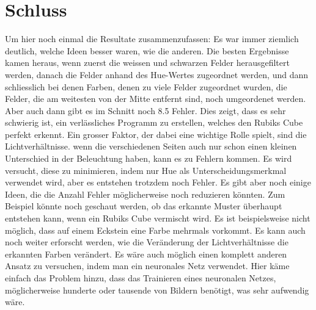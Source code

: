 \documentclass[a4paper, 12pt]{article}
\begin{document}
\section{Schluss}
Um hier noch einmal die Resultate zusammenzufassen: Es war immer ziemlich deutlich, welche Ideen besser waren, wie die anderen. Die besten Ergebnisse kamen heraus, wenn zuerst die weissen und schwarzen Felder herausgefiltert werden, danach die Felder anhand des Hue-Wertes zugeordnet werden, und dann schliesslich bei denen Farben, denen zu viele Felder zugeordnet wurden, die Felder, die am weitesten von der Mitte entfernt sind, noch umgeordenet werden. Aber auch dann gibt es im Schnitt noch 8.5 Fehler. Dies zeigt, dass es sehr schwierig ist, ein verlässliches Programm zu erstellen, welches den Rubiks Cube perfekt erkennt. Ein grosser Faktor, der dabei eine wichtige Rolle spielt, sind die Lichtverhältnisse. wenn die verschiedenen Seiten auch nur schon einen kleinen Unterschied in der Beleuchtung haben, kann es zu Fehlern kommen. Es wird versucht, diese zu minimieren, indem nur Hue als Unterscheidungsmerkmal verwendet wird, aber es entstehen trotzdem noch Fehler. Es gibt aber noch einige Ideen, die die Anzahl Fehler möglicherweise noch reduzieren könnten. Zum Beispiel könnte noch geschaut werden, ob das erkannte Muster überhaupt entstehen kann, wenn ein Rubiks Cube vermischt wird. Es ist beispielsweise nicht möglich, dass auf einem Eckstein eine Farbe mehrmals vorkommt. Es kann auch noch weiter erforscht werden, wie die Veränderung der Lichtverhältnisse die erkannten Farben verändert. Es wäre auch möglich einen komplett anderen Ansatz zu versuchen, indem man ein neuronales Netz verwendet. Hier käme einfach das Problem hinzu, dass das Trainieren eines neuronalen Netzes, möglicherweise hunderte oder tausende von Bildern benötigt, was sehr aufwendig wäre.
 
\end{document}
